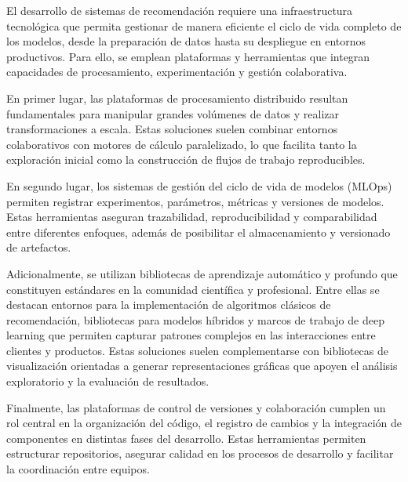 

El desarrollo de sistemas de recomendación requiere una infraestructura tecnológica que permita gestionar de manera eficiente el ciclo de vida completo de los modelos, desde la preparación de datos hasta su despliegue en entornos productivos. Para ello, se emplean plataformas y herramientas que integran capacidades de procesamiento, experimentación y gestión colaborativa.

En primer lugar, las plataformas de procesamiento distribuido resultan fundamentales para manipular grandes volúmenes de datos y realizar transformaciones a escala. Estas soluciones suelen combinar entornos colaborativos con motores de cálculo paralelizado, lo que facilita tanto la exploración inicial como la construcción de flujos de trabajo reproducibles.

En segundo lugar, los sistemas de gestión del ciclo de vida de modelos (MLOps) permiten registrar experimentos, parámetros, métricas y versiones de modelos. Estas herramientas aseguran trazabilidad, reproducibilidad y comparabilidad entre diferentes enfoques, además de posibilitar el almacenamiento y versionado de artefactos.

Adicionalmente, se utilizan bibliotecas de aprendizaje automático y profundo que constituyen estándares en la comunidad científica y profesional. Entre ellas se destacan entornos para la implementación de algoritmos clásicos de recomendación, bibliotecas para modelos híbridos y marcos de trabajo de deep learning que permiten capturar patrones complejos en las interacciones entre clientes y productos. Estas soluciones suelen complementarse con bibliotecas de visualización orientadas a generar representaciones gráficas que apoyen el análisis exploratorio y la evaluación de resultados.

Finalmente, las plataformas de control de versiones y colaboración cumplen un rol central en la organización del código, el registro de cambios y la integración de componentes en distintas fases del desarrollo. Estas herramientas permiten estructurar repositorios, asegurar calidad en los procesos de desarrollo y facilitar la coordinación entre equipos.

